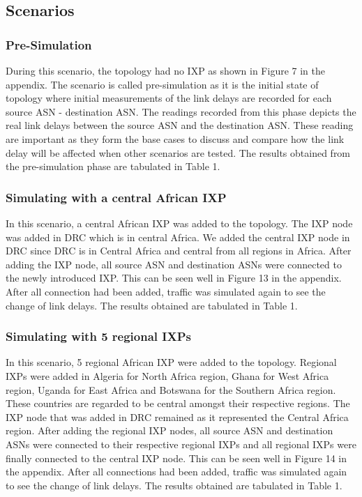  \subsection{Scenarios}
 \subsubsection{Pre-Simulation}
 During this scenario, the topology had no IXP as shown in Figure 7 in the appendix. The scenario is called pre-simulation as it is the initial state of topology where initial measurements of the link delays are recorded for each source ASN - destination ASN. The readings recorded from this phase depicts the real link delays between the source ASN and the destination ASN. These reading are important as they form the base cases to discuss and compare how the link delay will be affected when other scenarios are tested. The results obtained from the pre-simulation phase are tabulated in Table 1. 
 
 \subsubsection{Simulating with a central African IXP}
In this scenario, a central African IXP was added to the topology. The IXP node was added in DRC which is in central Africa. We added the central IXP node in DRC since DRC is in Central Africa and central from all regions in Africa. After adding the IXP node, all source ASN and destination ASNs were connected to the newly introduced IXP. This can be seen well in Figure 13 in the appendix. After all connection had been added, traffic was simulated again to see the change of link delays. The results obtained are tabulated in Table 1.   
  
 \subsubsection{Simulating with 5 regional IXPs}
 In this scenario, 5 regional African IXP were added to the topology. Regional IXPs were added in Algeria for North Africa region, Ghana for West Africa region, Uganda for East Africa and Botswana for the Southern Africa region. These countries are regarded to be central amongst their respective regions. The IXP node that was added in DRC remained as it represented the Central Africa region. After adding the regional IXP nodes, all source ASN and destination ASNs were connected to their respective regional IXPs and all regional IXPs were finally connected to the central IXP node. This can be seen well in Figure 14 in the appendix. After all connections had been added, traffic was simulated again to see the change of link delays. The results obtained are tabulated in Table 1.

